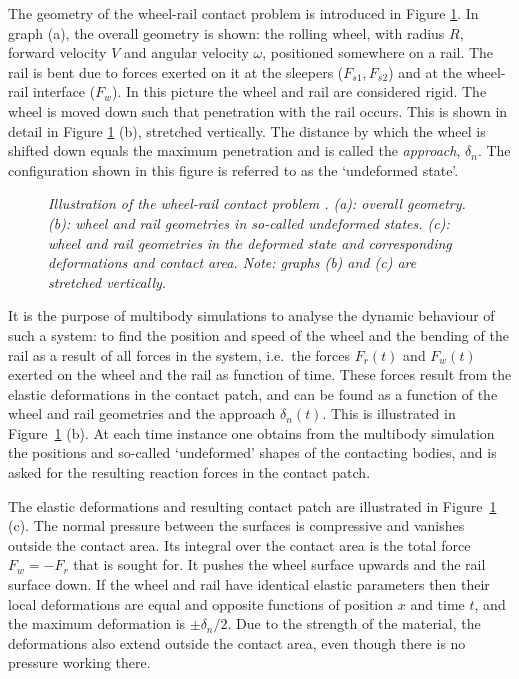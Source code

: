 \documentclass[12pt]{report}
\begin{document}
The geometry of the wheel-rail contact problem is introduced in Figure
\ref{fig:bent_rail}. In graph (a), the overall geometry is shown: the
rolling wheel, with radius $R$, forward velocity $V$ and angular velocity
$\omega$, positioned somewhere on a rail. The rail is bent due to forces
exerted on it at the sleepers ($F_{s1}, F_{s2}$) and at the wheel-rail
interface ($F_w$). In this picture the wheel and rail are considered rigid.
The wheel is moved down such that penetration with the rail occurs. This is
shown in detail in Figure \ref{fig:bent_rail} (b), stretched vertically.
The distance by which the wheel is shifted down equals the maximum
penetration and is called the {\em approach\/}, $\delta_n$. The configuration
shown in this figure is referred to as the `undeformed state'.

\begin{figure}[bt]
\centering
{}
\caption{\em Illustration of the wheel-rail contact problem 
\cite{Vollebregt2012a-quasistd}. (a): overall
geometry. (b): wheel and rail geometries in so-called undeformed states.
(c): wheel and rail geometries in the deformed state and corresponding
deformations and contact area. Note: graphs (b) and (c) are
stretched vertically.}
\label{fig:bent_rail}
\end{figure}

It is the purpose of multibody simulations to analyse the dynamic behaviour
of such a system: to find the position and speed of the wheel and the bending
of the rail as a result of all forces in the system, i.e.\
the forces $F_r(t)$ and $F_w(t)$ exerted on the wheel and the rail as
function of time. These forces result from the elastic deformations in the
contact patch, and can be found as a function of the wheel and rail
geometries and the approach $\delta_n(t)$. This is illustrated in
Figure~\ref{fig:bent_rail} (b). At each time instance one obtains from the
multibody simulation the positions and so-called `undeformed' shapes of
the contacting bodies, and is asked for the resulting reaction forces in
the contact patch.

The elastic deformations and resulting contact patch are illustrated in
Figure~\ref{fig:bent_rail} (c). The normal pressure between the surfaces is
compressive and vanishes outside the contact area. Its integral over the
contact area is the total force $F_w=-F_r$ that is sought for. It pushes
the wheel surface upwards and the rail surface down. If the wheel and rail
have identical elastic parameters then their local deformations are equal
and opposite functions of position $x$ and time $t$, and the maximum
deformation is $\pm\delta_n/2$. Due to the strength of the material, the
deformations also extend outside the contact area, even though there is no
pressure working there.
\end{document}
